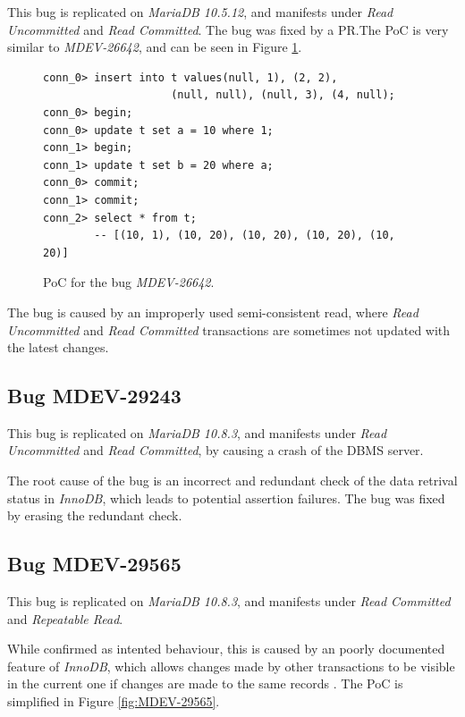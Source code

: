 This bug is replicated on \textit{MariaDB 10.5.12}, and manifests under \textit{Read Uncommitted} and \textit{Read Committed}. The bug was fixed by a PR.The PoC is very similar to \textit{MDEV-26642}, and can be seen in Figure \ref{fig:MDEV-26643}.


\begin{figure}
\begin{verbatim}
conn_0> insert into t values(null, 1), (2, 2),
                    (null, null), (null, 3), (4, null);
conn_0> begin;
conn_0> update t set a = 10 where 1;
conn_1> begin;
conn_1> update t set b = 20 where a;
conn_0> commit;
conn_1> commit;
conn_2> select * from t; 
        -- [(10, 1), (10, 20), (10, 20), (10, 20), (10, 20)]
\end{verbatim}
\caption{PoC for the bug \textit{MDEV-26642}.} \label{fig:MDEV-26643}
\end{figure}

The bug is caused by an improperly used semi-consistent read, where \textit{Read Uncommitted} and \textit{Read Committed} transactions are sometimes not updated with the latest changes.

\subsection*{Bug MDEV-29243}

This bug is replicated on \textit{MariaDB 10.8.3}, and manifests under \textit{Read Uncommitted} and \textit{Read Committed}, by causing a crash of the DBMS server.

The root cause of the bug is an incorrect and redundant check of the data retrival status in \textit{InnoDB}, which leads to potential assertion failures. The bug was fixed by erasing the redundant check.

\subsection*{Bug MDEV-29565}

This bug is replicated on \textit{MariaDB 10.8.3}, and manifests under \textit{Read Committed} and \textit{Repeatable Read}.

While confirmed as intented behaviour, this is caused by an poorly documented feature of \textit{InnoDB}, which allows changes made by other transactions to be visible in the current one if changes are made to the same records \cite{mysqlconsistentread}. The PoC is simplified in Figure \ref{fig:MDEV-29565}.

